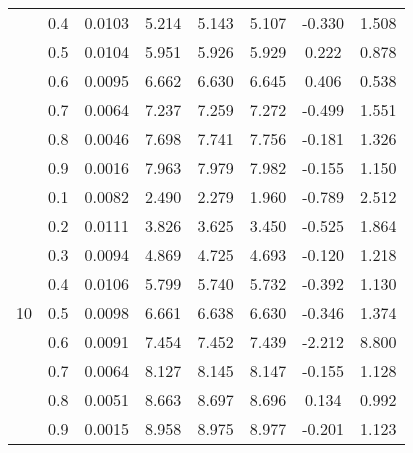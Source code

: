 \documentclass[11pt,a4paper]{report}
\begin{document}
\begin{longtable}{ | c | c || c | c | c | c | c | c | }
 & 0.4 & 0.0103 & 5.214 & 5.143 & 5.107 & -0.330 & 1.508 \\
 & 0.5 & 0.0104 & 5.951 & 5.926 & 5.929 & 0.222 & 0.878 \\
 & 0.6 & 0.0095 & 6.662 & 6.630 & 6.645 & 0.406 & 0.538 \\
 & 0.7 & 0.0064 & 7.237 & 7.259 & 7.272 & -0.499 & 1.551 \\
 & 0.8 & 0.0046 & 7.698 & 7.741 & 7.756 & -0.181 & 1.326 \\
 & 0.9 & 0.0016 & 7.963 & 7.979 & 7.982 & -0.155 & 1.150 \\
 \hline
\multirow{9}{*}{10} & 0.1 & 0.0082 & 2.490 & 2.279 & 1.960 & -0.789 & 2.512 \\
 & 0.2 & 0.0111 & 3.826 & 3.625 & 3.450 & -0.525 & 1.864 \\
 & 0.3 & 0.0094 & 4.869 & 4.725 & 4.693 & -0.120 & 1.218 \\
 & 0.4 & 0.0106 & 5.799 & 5.740 & 5.732 & -0.392 & 1.130 \\
 & 0.5 & 0.0098 & 6.661 & 6.638 & 6.630 & -0.346 & 1.374 \\
 & 0.6 & 0.0091 & 7.454 & 7.452 & 7.439 & -2.212 & 8.800 \\
 & 0.7 & 0.0064 & 8.127 & 8.145 & 8.147 & -0.155 & 1.128 \\
 & 0.8 & 0.0051 & 8.663 & 8.697 & 8.696 & 0.134 & 0.992 \\
 & 0.9 & 0.0015 & 8.958 & 8.975 & 8.977 & -0.201 & 1.123 \\
 \hline
\hline
\end{longtable}
\end{document}
